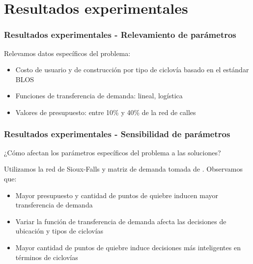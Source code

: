 \documentclass[aspectratio=43, 10pt]{beamer}
\begin{document}
\section{Resultados experimentales}

\begin{frame}
    \frametitle{Resultados experimentales - Relevamiento de parámetros}

    Relevamos datos específicos del problema:

    \begin{itemize}
        \item{Costo de usuario y de construcción por tipo de ciclovía basado en el estándar BLOS \parencite{blos2007}}
        \item{Funciones de transferencia de demanda: lineal, logística \parencite{shwe2014, ortuz2011}}
        \item{Valores de presupuesto: entre 10\% y 40\% de la red de calles \parencite{rios2015, shwe2014}}
    \end{itemize}
\end{frame}

\begin{frame}
    \frametitle{Resultados experimentales - Sensibilidad de parámetros}

    ¿Cómo afectan los parámetros específicos del problema a las soluciones?

    Utilizamos la red de Sioux-Falls y matriz de demanda tomada de \textcite{Liu2019}. Observamos que:

    \begin{itemize}
        \item{Mayor presupuesto y cantidad de puntos de quiebre inducen mayor transferencia de demanda}
        \item{Variar la función de transferencia de demanda afecta las decisiones de ubicación y tipos de ciclovías}
        \item{Mayor cantidad de puntos de quiebre induce decisiones más inteligentes en términos de ciclovías}
    \end{itemize}
\end{frame}
\end{document}
